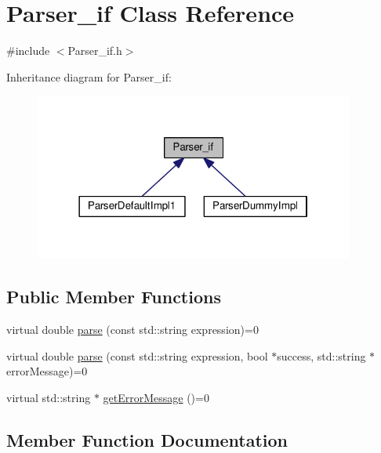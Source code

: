 \hypertarget{class_parser__if}{}\section{Parser\+\_\+if Class Reference}
\label{class_parser__if}


{\ttfamily \#include $<$Parser\+\_\+if.\+h$>$}



Inheritance diagram for Parser\+\_\+if\+:\nopagebreak
\begin{figure}[H]
\begin{center}
\leavevmode
\includegraphics[width=298pt]{class_parser__if__inherit__graph}
\end{center}
\end{figure}
\subsection*{Public Member Functions}
\begin{DoxyCompactItemize}
\item 
virtual double \hyperlink{class_parser__if_a4a5dacf0588b29e7eb6c639ae2701fa6}{parse} (const std\+::string expression)=0
\item 
virtual double \hyperlink{class_parser__if_af163b0c5b081ccfa2ba04267cd4741b1}{parse} (const std\+::string expression, bool $\ast$success, std\+::string $\ast$error\+Message)=0
\item 
virtual std\+::string $\ast$ \hyperlink{class_parser__if_ac5a1c10d89c4867750784308944d1521}{get\+Error\+Message} ()=0
\end{DoxyCompactItemize}


\subsection{Member Function Documentation}
